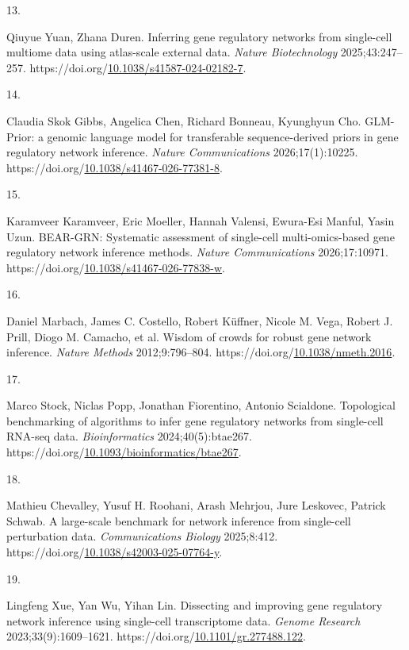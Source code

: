 \documentclass[
  11pt,
]{article}
\newlength{\cslhangindent}
\newlength{\csllabelwidth}
\newenvironment{CSLReferences}[2] %
 {\begin{list}{}{%
  \setlength{\itemindent}{0pt}
  \setlength{\leftmargin}{0pt}
  \setlength{\parsep}{0pt}
  \ifodd #1
   \setlength{\leftmargin}{\cslhangindent}
   \setlength{\itemindent}{-1\cslhangindent}
  \fi
  \setlength{\itemsep}{#2\baselineskip}}}
 {\end{list}}
\newcommand{\CSLLeftMargin}[1]{\parbox[t]{\csllabelwidth}{\strut#1\strut}}
\newcommand{\CSLRightInline}[1]{\parbox[t]{\linewidth - \csllabelwidth}{\strut#1\strut}}
\begin{document}
\begin{CSLReferences}{0}{1}
\CSLLeftMargin{13. }%
\CSLRightInline{Qiuyue Yuan, Zhana Duren. Inferring gene regulatory
networks from single-cell multiome data using atlas-scale external data.
\emph{Nature Biotechnology} 2025;43:247--257.
https://doi.org/\href{https://doi.org/10.1038/s41587-024-02182-7}{10.1038/s41587-024-02182-7}.}

\CSLLeftMargin{14. }%
\CSLRightInline{Claudia Skok Gibbs, Angelica Chen, Richard Bonneau,
Kyunghyun Cho. GLM-Prior: a genomic language model for transferable
sequence-derived priors in gene regulatory network inference.
\emph{Nature Communications} 2026;17(1):10225.
https://doi.org/\href{https://doi.org/10.1038/s41467-026-77381-8}{10.1038/s41467-026-77381-8}.}

\CSLLeftMargin{15. }%
\CSLRightInline{Karamveer Karamveer, Eric Moeller, Hannah Valensi,
Ewura-Esi Manful, Yasin Uzun. BEAR-GRN: Systematic assessment of
single-cell multi-omics-based gene regulatory network inference methods.
\emph{Nature Communications} 2026;17:10971.
https://doi.org/\href{https://doi.org/10.1038/s41467-026-77838-w}{10.1038/s41467-026-77838-w}.}

\CSLLeftMargin{16. }%
\CSLRightInline{Daniel Marbach, James C. Costello, Robert Küffner,
Nicole M. Vega, Robert J. Prill, Diogo M. Camacho, et al. Wisdom of
crowds for robust gene network inference. \emph{Nature Methods}
2012;9:796--804.
https://doi.org/\href{https://doi.org/10.1038/nmeth.2016}{10.1038/nmeth.2016}.}

\CSLLeftMargin{17. }%
\CSLRightInline{Marco Stock, Niclas Popp, Jonathan Fiorentino, Antonio
Scialdone. Topological benchmarking of algorithms to infer gene
regulatory networks from single-cell RNA-seq data. \emph{Bioinformatics}
2024;40(5):btae267.
https://doi.org/\href{https://doi.org/10.1093/bioinformatics/btae267}{10.1093/bioinformatics/btae267}.}

\CSLLeftMargin{18. }%
\CSLRightInline{Mathieu Chevalley, Yusuf H. Roohani, Arash Mehrjou, Jure
Leskovec, Patrick Schwab. A large-scale benchmark for network inference
from single-cell perturbation data. \emph{Communications Biology}
2025;8:412.
https://doi.org/\href{https://doi.org/10.1038/s42003-025-07764-y}{10.1038/s42003-025-07764-y}.}

\CSLLeftMargin{19. }%
\CSLRightInline{Lingfeng Xue, Yan Wu, Yihan Lin. Dissecting and
improving gene regulatory network inference using single-cell
transcriptome data. \emph{Genome Research} 2023;33(9):1609--1621.
https://doi.org/\href{https://doi.org/10.1101/gr.277488.122}{10.1101/gr.277488.122}.}


\end{CSLReferences}
\end{document}
